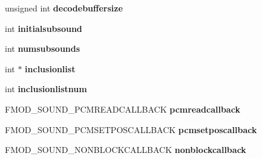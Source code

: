 \begin{DoxyCompactItemize}
\item 
\hypertarget{struct_f_m_o_d___c_r_e_a_t_e_s_o_u_n_d_e_x_i_n_f_o_a854f54e774c81c959da15a09348af9bf}{unsigned int {\bfseries decodebuffersize}}\label{struct_f_m_o_d___c_r_e_a_t_e_s_o_u_n_d_e_x_i_n_f_o_a854f54e774c81c959da15a09348af9bf}

\item 
\hypertarget{struct_f_m_o_d___c_r_e_a_t_e_s_o_u_n_d_e_x_i_n_f_o_a0b6b37604abb632c74c1912b7de6cf8a}{int {\bfseries initialsubsound}}\label{struct_f_m_o_d___c_r_e_a_t_e_s_o_u_n_d_e_x_i_n_f_o_a0b6b37604abb632c74c1912b7de6cf8a}

\item 
\hypertarget{struct_f_m_o_d___c_r_e_a_t_e_s_o_u_n_d_e_x_i_n_f_o_a84eebd6ba29eb025470d074fb9c36c32}{int {\bfseries numsubsounds}}\label{struct_f_m_o_d___c_r_e_a_t_e_s_o_u_n_d_e_x_i_n_f_o_a84eebd6ba29eb025470d074fb9c36c32}

\item 
\hypertarget{struct_f_m_o_d___c_r_e_a_t_e_s_o_u_n_d_e_x_i_n_f_o_a6a9fda68184f91419dd8d523db749ad7}{int $\ast$ {\bfseries inclusionlist}}\label{struct_f_m_o_d___c_r_e_a_t_e_s_o_u_n_d_e_x_i_n_f_o_a6a9fda68184f91419dd8d523db749ad7}

\item 
\hypertarget{struct_f_m_o_d___c_r_e_a_t_e_s_o_u_n_d_e_x_i_n_f_o_ab06a599a0214646ffe412edc75ef812e}{int {\bfseries inclusionlistnum}}\label{struct_f_m_o_d___c_r_e_a_t_e_s_o_u_n_d_e_x_i_n_f_o_ab06a599a0214646ffe412edc75ef812e}

\item 
\hypertarget{struct_f_m_o_d___c_r_e_a_t_e_s_o_u_n_d_e_x_i_n_f_o_aa58ca119eb7ae9de48bd4a187d9e9e45}{F\-M\-O\-D\-\_\-\-S\-O\-U\-N\-D\-\_\-\-P\-C\-M\-R\-E\-A\-D\-C\-A\-L\-L\-B\-A\-C\-K {\bfseries pcmreadcallback}}\label{struct_f_m_o_d___c_r_e_a_t_e_s_o_u_n_d_e_x_i_n_f_o_aa58ca119eb7ae9de48bd4a187d9e9e45}

\item 
\hypertarget{struct_f_m_o_d___c_r_e_a_t_e_s_o_u_n_d_e_x_i_n_f_o_ac8e4d22cd238655b7b9a4d5c4623601c}{F\-M\-O\-D\-\_\-\-S\-O\-U\-N\-D\-\_\-\-P\-C\-M\-S\-E\-T\-P\-O\-S\-C\-A\-L\-L\-B\-A\-C\-K {\bfseries pcmsetposcallback}}\label{struct_f_m_o_d___c_r_e_a_t_e_s_o_u_n_d_e_x_i_n_f_o_ac8e4d22cd238655b7b9a4d5c4623601c}

\item 
\hypertarget{struct_f_m_o_d___c_r_e_a_t_e_s_o_u_n_d_e_x_i_n_f_o_ac7d4f60695e9ae96c478692bb404e586}{F\-M\-O\-D\-\_\-\-S\-O\-U\-N\-D\-\_\-\-N\-O\-N\-B\-L\-O\-C\-K\-C\-A\-L\-L\-B\-A\-C\-K {\bfseries nonblockcallback}}\label{struct_f_m_o_d___c_r_e_a_t_e_s_o_u_n_d_e_x_i_n_f_o_ac7d4f60695e9ae96c478692bb404e586}


\end{DoxyCompactItemize}
